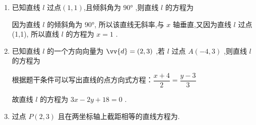 \begin{enumerate}
    \item 已知直线 $l$ 过点$(1,1)$,且倾斜角为 $\ang{90}$ ,则直线 $l$ 的方程为
    \begin{jieda}
        因为直线 $l$ 的倾斜角为 $\ang{90}$, 所以该直线无斜率,与 $x$ 轴垂直,又因为直线 $l$ 过点(1,1), 所以直线 $l$ 的方程为 $x = 1$ .
    \end{jieda} 
    \item 已知直线 $l$ 的一个方向向量为 $\vv{d} = \left( {2,3}\right)$ ,若 $l$ 过点 $A\left( {-4,3}\right)$ ,则直线 $l$ 的方程为
    \begin{jieda}
        根据题干条件可以写出直线的点方向式方程：$\dfrac{x+4}{2} = \dfrac{y-3}{3}$
        
        故直线 $l$ 的方程为 $3x-2y+18=0$ .
    \end{jieda}
    \item 过点 $P\left( {2,3}\right)$ 且在两坐标轴上截距相等的直线方程为.
    \begin{jieda}
    \end{jieda}


\end{enumerate}
